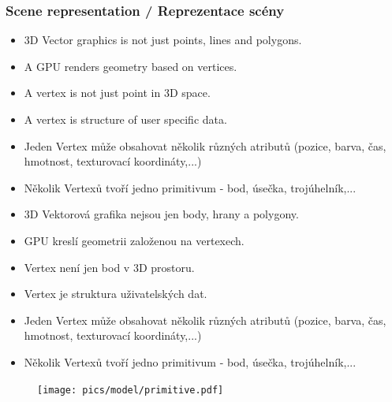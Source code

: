 \begin{frame}
\frametitle{Scene representation / Reprezentace scény}
  \scriptsize
	\begin{itemize}
    \item{3D Vector graphics is not just points, lines and polygons.}
    \item{A GPU renders geometry based on vertices.}
    \item{A vertex is not just point in 3D space.}
    \item{A vertex is structure of user specific data.}
		\item{Jeden Vertex může obsahovat několik různých atributů (pozice, barva, čas, hmotnost, texturovací koordináty,...)}
		\item{Několik Vertexů tvoří jedno primitivum - bod, úsečka, trojúhelník,...}
	\end{itemize}

	\begin{itemize}
    \item{3D Vektorová grafika nejsou jen body, hrany a polygony.}
    \item{GPU kreslí geometrii založenou na vertexech.}
    \item{Vertex není jen bod v 3D prostoru.}
    \item{Vertex je struktura uživatelských dat.}
		\item{Jeden Vertex může obsahovat několik různých atributů (pozice, barva, čas, hmotnost, texturovací koordináty,...)}
		\item{Několik Vertexů tvoří jedno primitivum - bod, úsečka, trojúhelník,...}
	\end{itemize}
	\begin{figure}[h]
		\texttt{[image: pics/model/primitive.pdf]}
	\end{figure}
\end{frame}

